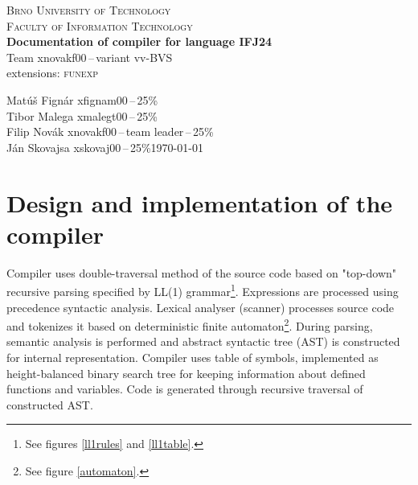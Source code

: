 \documentclass[a4paper, 11pt]{article}
\begin{document}
\begin{titlepage}
    \begin{center}
        \textsc{\Huge{Brno University of Technology\\[0.4em]}
        \huge{Faculty of Information Technology}}\\        
        \huge{\textbf{Documentation of compiler for language \textsc{IFJ24}}}\\
        \LARGE{Team xnovakf00\,--\,variant vv-BVS}\\
        \Large{extensions: \textsc{funexp}}\\
    \end{center}
    \Large{Matúš Fignár xfignam00\,--\,25\%\\
            Tibor Malega xmalegt00\,--\,25\%\\
            Filip Novák xnovakf00\,--\,team leader\,--\,25\%\\
            Ján Skovajsa xskovaj00\,--\,25\%\hfill \today}
\end{titlepage}

\tableofcontents
\newpage
\listoffigures
\newpage



\section{Design and implementation of the compiler}
Compiler uses double-traversal method of the source code based on "top-down" recursive parsing specified by
LL(1) grammar\footnote{See figures \ref{ll1rules} and \ref{ll1table}.}. Expressions are processed using precedence syntactic
analysis. Lexical analyser (scanner) processes source code and tokenizes it based on deterministic finite automaton\footnote{See figure \ref{automaton}.}.
During parsing, semantic analysis is performed and abstract syntactic tree (AST) is constructed for internal representation.
Compiler uses table of symbols, implemented as height-balanced binary search tree for keeping information about defined functions and variables.
Code is generated through recursive traversal of constructed AST.
\end{document}
